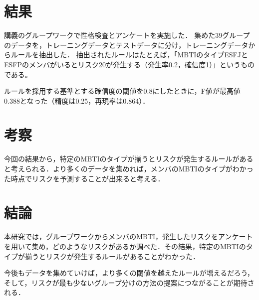 \documentclass[uplatex,twocolumn,dvipdfmx]{jsarticle}
\begin{document}
\section{結果}
講義のグループワークで性格検査とアンケートを実施した．
集めた39グループのデータを，トレーニングデータとテストデータに分け，トレーニングデータからルールを抽出した．
抽出されたルールはたとえば，「MBTIのタイプESFJとESFPのメンバがいるとリスク20が発生する（発生率0.2，確信度1）」というものである。

ルールを採用する基準とする確信度の閾値を0.8にしたときに，F値が最高値0.388となった（精度は0.25，再現率は0.864）．
\section{考察}
今回の結果から，特定のMBTIのタイプが揃うとリスクが発生するルールがあると考えられる．より多くのデータを集めれば，メンバのMBTIのタイプがわかった時点でリスクを予測することが出来ると考える．

\section{結論}
本研究では，グループワークからメンバのMBTI，発生したリスクをアンケートを用いて集め，どのようなリスクがあるか調べた．その結果，特定のMBTIのタイプが揃うとリスクが発生するルールがあることがわかった．

今後もデータを集めていけば，より多くの閾値を越えたルールが増えるだろう，そして，リスクが最も少ないグループ分けの方法の提案につながることが期待される．
\nocite{MBTI}

\end{document}
